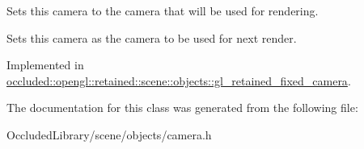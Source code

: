 Sets this camera to the camera that will be used for rendering. 

Sets this camera as the camera to be used for next render. 

Implemented in \hyperlink{classoccluded_1_1opengl_1_1retained_1_1scene_1_1objects_1_1gl__retained__fixed__camera_a81ea1cd723428ac234ca814c43363a90}{occluded\+::opengl\+::retained\+::scene\+::objects\+::gl\+\_\+retained\+\_\+fixed\+\_\+camera}.



The documentation for this class was generated from the following file\+:\begin{DoxyCompactItemize}
\item 
Occluded\+Library/scene/objects/camera.\+h\end{DoxyCompactItemize}
